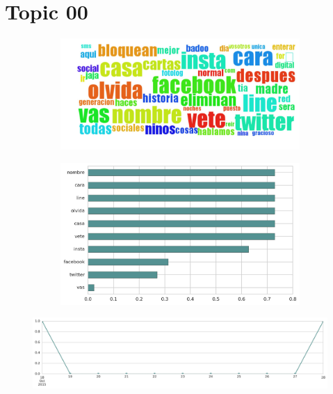 \clearpage

\section{Topic 00}

\begin{figure}[htbp!]
    \centering
    \begin{subfigure}[b]{0.49\textwidth}
        \includegraphics[width=\textwidth]{twitter_murcia/report_images/topic-00-wordcloud.jpg}
    \end{subfigure}
    \begin{subfigure}[b]{0.49\textwidth}
        \includegraphics[width=\textwidth]{twitter_murcia/report_images/topic-00-terms.jpg}
    \end{subfigure}
\end{figure}

\begin{figure}[htbp!]
    \centering
    \includegraphics[width=\textwidth]{twitter_murcia/report_images/topic-00-timeseries.jpg}
\end{figure}

